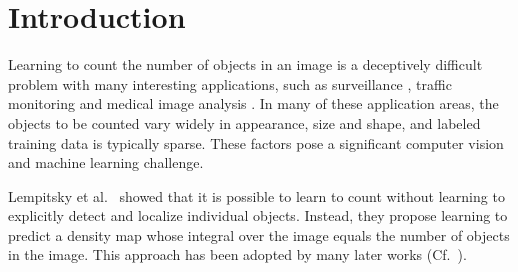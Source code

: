 \documentclass[10pt,twocolumn,letterpaper]{article}
\begin{document}
%



\section{Introduction}

Learning to count the number of objects in an image is a deceptively difficult problem with many interesting applications, such as surveillance \cite{ryan2009crowd}, traffic monitoring \cite{TRANCOSdataset_IbPRIA2015} and medical image analysis \cite{selinummi2005software}.  In many of these application areas, the objects to be counted vary widely in appearance, size and shape, and labeled training data is typically sparse. These factors pose a significant computer vision and machine learning challenge.

Lempitsky et al.~\cite{lempitsky2010} showed that it is possible to learn to count without learning to explicitly detect and localize individual objects. Instead, they propose learning to predict a density map whose integral over the image equals the number of objects in the image. This approach has been adopted by many later works (Cf.~\cite{rubio2016,zhang2016single}).

\end{document}
